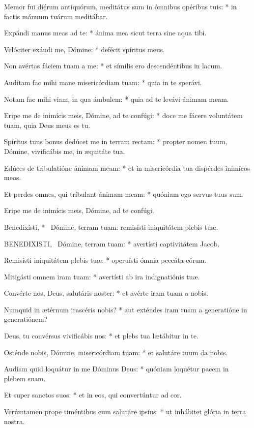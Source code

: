 Memor fui diérum antiquórum, meditátus sum in ómnibus opéribus tuis: * in factis mánuum tuárum meditábar.

Expándi manus meas ad te: * ánima mea sicut terra sine aqua tibi.

Velóciter exáudi me, Dómine: * defécit spíritus meus.

Non avértas fáciem tuam a me: * et símilis ero descendéntibus in lacum.

Audítam fac mihi mane misericórdiam tuam: * quia in te sperávi.

Notam fac mihi viam, in qua ámbulem: * quia ad te levávi ánimam meam.

Eripe me de inimícis meis, Dómine, ad te confúgi: * doce me fácere voluntátem tuam, quia Deus meus es tu.

Spíritus tuus bonus dedúcet me in terram rectam: * propter nomen tuum, Dómine, vivificábis me, in æquitáte tua.

Edúces de tribulatióne ánimam meam: * et in misericórdia tua dispérdes inimícos meos.

Et perdes omnes, qui tríbulant ánimam meam: * quóniam ego servus tuus sum.

 Eripe me de inimícis meis, Dómine, ad te confúgi.

 Benedixísti, * \textdagger\ Dómine, terram tuam: remisísti iniquitátem plebis tuæ.


\lettrine[lines=2]{B}{ENEDIXISTI}, \textdagger\ Dómine, terram tuam: * avertísti captivitátem Jacob.

Remisísti iniquitátem plebis tuæ: * operuísti ómnia peccáta eórum.

Mitigásti omnem iram tuam: * avertísti ab ira indignatiónis tuæ.

Convérte nos, Deus, salutáris noster: * et avérte iram tuam a nobis.

Numquid in ætérnum irascéris nobis? * aut exténdes iram tuam a generatióne in generatiónem?

Deus, tu convérsus vivificábis nos: * et plebs tua lætábitur in te.

Osténde nobis, Dómine, misericórdiam tuam: * et salutáre tuum da nobis.

Audiam quid loquátur in me Dóminus Deus: * quóniam loquétur pacem in plebem suam.

Et super sanctos suos: * et in eos, qui convertúntur ad cor.

Verúmtamen prope timéntibus eum salutáre ipsíus: * ut inhábitet glória in terra nostra.

